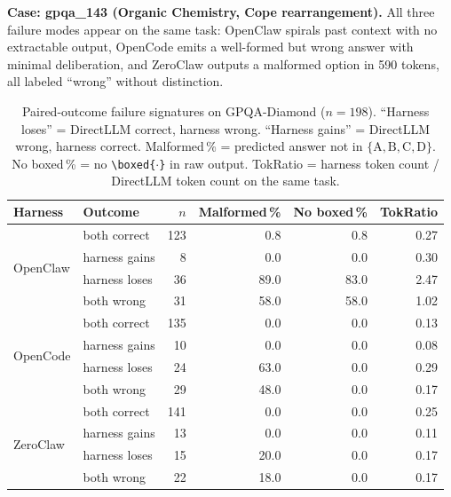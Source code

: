 \textbf{Case: gpqa\_143 (Organic Chemistry, Cope rearrangement).}
All three failure modes appear on the same task: OpenClaw spirals past context
with no extractable output, OpenCode emits a well-formed but wrong answer with
minimal deliberation, and ZeroClaw outputs a malformed option in 590 tokens,
all labeled ``wrong'' without distinction.

\begin{table}[t]
\centering
\small
\caption{%
  Paired-outcome failure signatures on GPQA-Diamond ($n=198$).
  ``Harness loses'' = DirectLLM correct, harness wrong.
  ``Harness gains'' = DirectLLM wrong, harness correct.
  Malformed\,\% = predicted answer not in $\{\mathrm{A,B,C,D}\}$.
  No boxed\,\% = no \texttt{\textbackslash boxed\{$\cdot$\}} in raw output.
  TokRatio = harness token count / DirectLLM token count on the same task.
}
\label{tab:gpqa-failure-sig}
\setlength{\tabcolsep}{3.5pt}
\begin{tabular}{llrrrr}
\toprule
Harness & Outcome & $n$ & Malformed\,\% & No boxed\,\% & TokRatio \\
\midrule
\multirow{4}{*}{OpenClaw}
 & both correct  & 123 &  0.8 &  0.8 & 0.27 \\
 & harness gains &   8 &  0.0 &  0.0 & 0.30 \\
 & harness loses &  36 & 89.0 & 83.0 & 2.47 \\
 & both wrong    &  31 & 58.0 & 58.0 & 1.02 \\
\midrule
\multirow{4}{*}{OpenCode}
 & both correct  & 135 &  0.0 &  0.0 & 0.13 \\
 & harness gains &  10 &  0.0 &  0.0 & 0.08 \\
 & harness loses &  24 & 63.0 &  0.0 & 0.29 \\
 & both wrong    &  29 & 48.0 &  0.0 & 0.17 \\
\midrule
\multirow{4}{*}{ZeroClaw}
 & both correct  & 141 &  0.0 &  0.0 & 0.25 \\
 & harness gains &  13 &  0.0 &  0.0 & 0.11 \\
 & harness loses &  15 & 20.0 &  0.0 & 0.17 \\
 & both wrong    &  22 & 18.0 &  0.0 & 0.17 \\
\bottomrule
\end{tabular}
\end{table}


